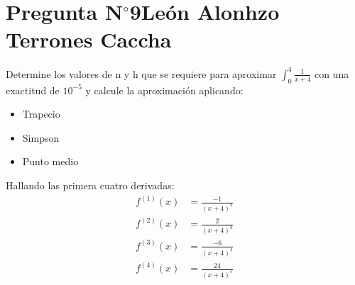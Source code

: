 \section{Pregunta N$^{\circ}$9\qquad León Alonhzo Terrones Caccha}

\begin{frame}
    Determine los valores de n y h que se requiere para aproximar $\int_{0}^{4}\frac{1}{x+4}$ con una exactitud de $10^{-5}$ y calcule la aproximación aplicando:
    \begin{itemize}
        \item Trapecio 
        \item Simpson 
        \item Punto medio
    \end{itemize}
              

    \begin{solution}
        Hallando las primera cuatro derivadas:
        \begin{align*}
            f^{(1)}(x)&=\frac{-1}{(x+4)^2}\\
            f^{(2)}(x)&=\frac{2}{(x+4)^3}\\
            f^{(3)}(x)&=\frac{-6}{(x+4)^4}\\
            f^{(4)}(x)&=\frac{24}{(x+4)^5}
        \end{align*}
    \end{solution}
\end{frame}

